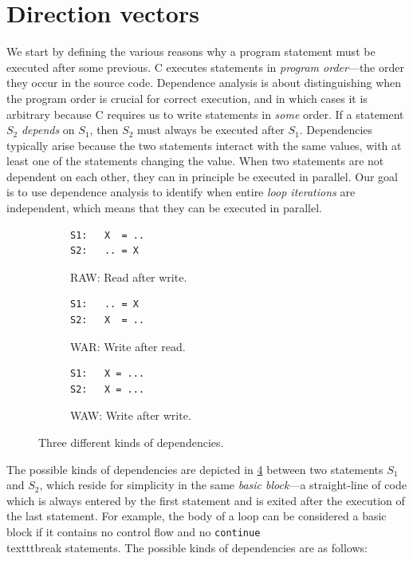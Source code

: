 \section{Direction vectors}
\label{sec:dir-vct}

We start by defining the various reasons why a program statement must
be executed after some previous.  C executes statements in
\emph{program order}---the order they occur in the source code.
Dependence analysis is about distinguishing when the program order is
crucial for correct execution, and in which cases it is arbitrary
because C requires us to write statements in \emph{some} order.  If a
statement $S_{2}$ \emph{depends} on $S_{1}$, then $S_{2}$
must always be executed after $S_{1}$.  Dependencies typically
arise because the two statements interact with the same values, with
at least one of the statements changing the value.  When two
statements are not dependent on each other, they can in principle be
executed in parallel.  Our goal is to use dependence analysis to
identify when entire \emph{loop iterations} are independent, which
means that they can be executed in parallel.

\begin{figure}
  \centering
  \begin{subfigure}[t]{0.32\textwidth}
\begin{lstlisting}
S1:   X  = ..
S2:   .. = X
\end{lstlisting}
\caption{RAW: Read after write.}
\label{fig:raw}
  \end{subfigure}
  \hfill
  \begin{subfigure}[t]{0.32\textwidth}
\begin{lstlisting}
S1:   .. = X
S2:   X  = ..
\end{lstlisting}
\caption{WAR: Write after read.}
\label{fig:war}
  \end{subfigure}
  \hfill
  \begin{subfigure}[t]{0.33\textwidth}
\begin{lstlisting}
S1:   X = ...
S2:   X = ...
\end{lstlisting}
\caption{WAW: Write after write.}
\label{fig:waw}
  \end{subfigure}
  \caption{Three different kinds of dependencies.}
  \label{fig:dependencies}
\end{figure}

The possible kinds of dependencies are depicted in
\cref{fig:dependencies} between two statements $S_{1}$ and
$S_{2}$, which reside for simplicity in the same \emph{basic
  block}---a straight-line of code which is always entered by the
first statement and is exited after the execution of the last
statement.  For example, the body of a loop can be considered a basic
block if it contains no control flow and no
\texttt{continue}\\texttt{break} statements.  The possible kinds of
dependencies are as follows:


